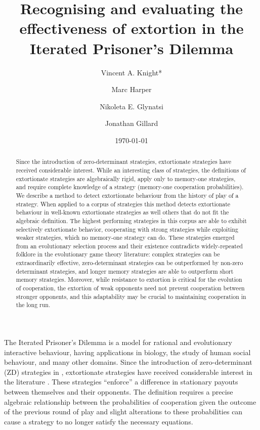 \documentclass[a4paper]{article}
\title{Recognising and evaluating the effectiveness
       of extortion in the Iterated Prisoner's Dilemma}
\author[1]{Vincent A. Knight*}
\author[2]{Marc Harper}
\author[1]{Nikoleta E. Glynatsi}
\author[1]{Jonathan Gillard}
\affil[1]{Cardiff University, School of Mathematics, Cardiff, United Kingdom}
\affil[2]{Google Inc., Mountain View, CA, United States of America}
\date{\today}
\begin{document}
\maketitle

\begin{abstract}

Since the introduction of zero-determinant strategies, extortionate strategies
have received considerable interest. While an interesting class of strategies,
the definitions of extortionate strategies are algebraically rigid, apply only
to memory-one strategies, and require complete knowledge of a strategy (memory-one
cooperation probabilities). We describe a method to detect extortionate
behaviour from the history of play of a strategy. When applied to a corpus of
strategies this method
detects extortionate behaviour in well-known extortionate strategies as well
others that do not fit the algebraic definition. The highest performing
strategies in this corpus are able to exhibit selectively extortionate behavior,
cooperating with strong strategies while exploiting weaker strategies, which no
memory-one strategy can do. These strategies emerged from an evolutionary
selection process and their existence contradicts widely-repeated folklore in
the evolutionary game theory literature: complex strategies can be
extraordinarily effective, zero-determinant strategies can be outperformed by
non-zero determinant strategies, and longer memory strategies are able to
outperform short memory strategies. Moreover, while resistance to extortion is
critical for the evolution of cooperation, the extortion of weak opponents
need not prevent cooperation between stronger opponents, and this adaptability
may be crucial to maintaining cooperation in the long run.
\end{abstract}

The Iterated Prisoner's Dilemma is a model for rational and evolutionary
interactive behaviour, having applications in biology, the study of human
social behaviour, and many other domains. Since the introduction of
zero-determinant (ZD) strategies in \cite{Press2012}, extortionate strategies have
received considerable interest in the literature \cite{hilbe2015partners}.
These strategies ``enforce'' a difference in stationary
payouts between themselves and their opponents. The definition requires a
precise algebraic relationship between the probabilities of cooperation given
the outcome of the previous round of play and slight alterations to these
probabilities can cause a strategy to no longer satisfy the necessary equations.
\end{document}
